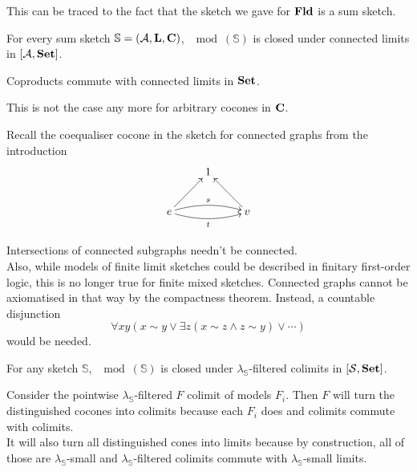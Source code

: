 This can be traced to the fact that the sketch we gave for $\mathbf{Fld}$ is a sum sketch. 

\begin{Proposition}\label{prop:sumconnectedlimits}
For every sum sketch $\mathbb S = (\mathcal{A}, \textbf{L}, \textbf{C})$, $\mod(\mathbb S)$ is closed under connected limits in $[\mathcal{A},\mathbf{Set}]$.
\end{Proposition}
\begin{Proof}
Coproducts commute with connected limits in $\mathbf{Set}$.
\end{Proof}

This is not the case any more for arbitrary cocones in $\textbf{C}$.
\begin{Example} 
\label{ex:cxgraph}
Recall the coequaliser cocone in the sketch for connected graphs from the introduction
\[
\xymatrix{
& 1 \\
e \ar@/^/[rr]^{s} \ar@/_/[rr]_{t} \ar[ru] & & v \ar[lu] \\
}\]
\end{Example}
Intersections of connected subgraphs needn't be connected. \\

Also, while models of finite limit sketches could be described in finitary first-order logic, this is no longer true for finite mixed sketches. Connected graphs cannot be axiomatised in that way by the compactness theorem. Instead, a countable disjunction
\[ \forall x y \left(x \sim y \vee \exists z(x \sim z \wedge z \sim y) \vee \cdots\right) \] would be needed.

\begin{Proposition}\label{prop:modsdirectedcolimits}
For any sketch $\mathbb S$, $\mod(\mathbb S)$ is closed under $\lambda_\mathbb S$-filtered colimits in $[\mathcal{S},\mathbf{Set}]$.
\end{Proposition}
\begin{Proof}
Consider the pointwise $\lambda_\mathbb S$-filtered $F$ colimit of models $F_i$. Then $F$ will turn the distinguished cocones into colimits because each $F_i$ does and colimits commute with colimits. \\

It will also turn all distinguished cones into limits because by construction, all of those are $\lambda_\mathbb S$-small and $\lambda_\mathbb S$-filtered colimits commute with $\lambda_\mathbb S$-small limits.
\end{Proof}